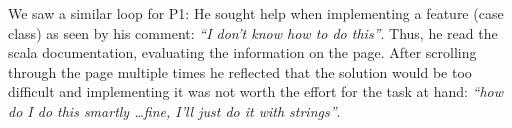 

We saw a similar loop for P1: He sought help when implementing a feature (case class) as seen by his comment: \emph{``I don't know how to do this''}. Thus, he read the scala documentation, evaluating the information on the page. After scrolling through the page multiple times he reflected that the solution would be too difficult and   implementing it was not worth the effort for the task at hand: \emph{``how do I do this smartly \ldots fine, I'll just do it with strings''}.





